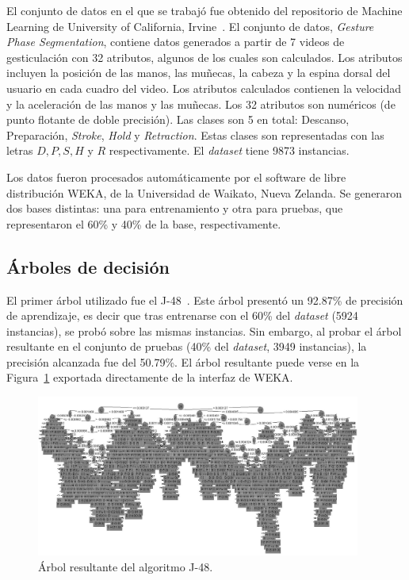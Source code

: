\documentclass{llncs}
\begin{document}
El conjunto de datos en el que se trabajó fue obtenido del repositorio de Machine Learning de University of California, Irvine~\cite{Lichman2013,Madeo2013}.
El conjunto de datos, \textit{Gesture Phase Segmentation},
contiene datos generados a partir de 7 videos de gesticulación con 32 atributos,
algunos de los cuales son calculados.
Los atributos incluyen la posición de las manos, las muñecas, la cabeza y la espina dorsal del usuario en cada cuadro del video.
Los atributos calculados contienen la velocidad y la aceleración de las manos y las muñecas.
Los 32 atributos son numéricos (de punto flotante de doble precisión).
Las clases son 5 en total: Descanso, Preparación, \textit{Stroke}, \textit{Hold} y \textit{Retraction}.
Estas clases son representadas con las letras $D, P, S, H$ y $R$ respectivamente.
El \textit{dataset} tiene 9873 instancias.

Los datos fueron procesados automáticamente por el software de libre distribución WEKA, de la Universidad de Waikato, Nueva Zelanda.
Se generaron dos bases distintas: una para entrenamiento y otra para pruebas, que representaron el 60\% y 40\% de la base, respectivamente.

\subsection{Árboles de decisión}
\label{subsec:trees}

El primer árbol utilizado fue el J-48~\cite{Quinlan1993}.
Este árbol presentó un 92.87\% de precisión de aprendizaje,
es decir que tras entrenarse con el 60\% del \textit{dataset} (5924 instancias),
se probó sobre las mismas instancias.
Sin embargo, al probar el árbol resultante en el conjunto de pruebas
(40\% del \textit{dataset}, 3949 instancias),
la precisión alcanzada fue del 50.79\%.
El árbol resultante puede verse en la Figura~\ref{fig:j48} exportada directamente de la interfaz de WEKA.

\begin{figure}[htbp]
	\centering
	\includegraphics[width=0.95\textwidth]{05-j48}
	\caption{Árbol resultante del algoritmo J-48.}
	\label{fig:j48}
\end{figure}
\end{document}
